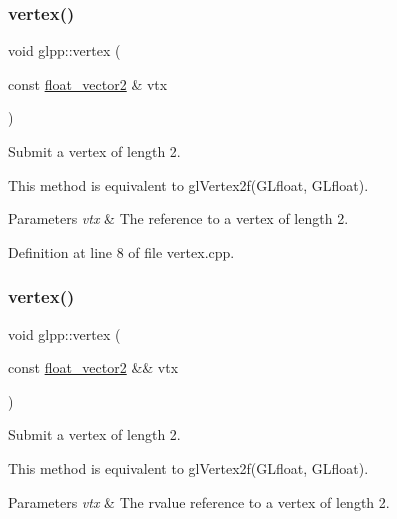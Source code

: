 \subsubsection{\texorpdfstring{vertex()}{vertex()}\hspace{0.1cm}{\footnotesize\ttfamily [1/8]}}
{\footnotesize\ttfamily void glpp\+::vertex (\begin{DoxyParamCaption}\item[{const \hyperlink{namespaceglpp_ace2f7da7495fc7d1623d97a444c87146}{float\+\_\+vector2} \&}]{vtx }\end{DoxyParamCaption})\hspace{0.3cm}{\ttfamily [noexcept]}}



Submit a vertex of length 2. 

This method is equivalent to gl\+Vertex2f(\+G\+Lfloat, G\+Lfloat).


\begin{DoxyParams}{Parameters}
{\em vtx} & The reference to a vertex of length 2. \\
\hline
\end{DoxyParams}


Definition at line 8 of file vertex.\+cpp.

\mbox{\label{namespaceglpp_ab739a17e9e588957b21d938df042524b}} 
\subsubsection{\texorpdfstring{vertex()}{vertex()}\hspace{0.1cm}{\footnotesize\ttfamily [2/8]}}
{\footnotesize\ttfamily void glpp\+::vertex (\begin{DoxyParamCaption}\item[{const \hyperlink{namespaceglpp_ace2f7da7495fc7d1623d97a444c87146}{float\+\_\+vector2} \&\&}]{vtx }\end{DoxyParamCaption})\hspace{0.3cm}{\ttfamily [noexcept]}}



Submit a vertex of length 2. 

This method is equivalent to gl\+Vertex2f(\+G\+Lfloat, G\+Lfloat).


\begin{DoxyParams}{Parameters}
{\em vtx} & The rvalue reference to a vertex of length 2. \\
\hline
\end{DoxyParams}


